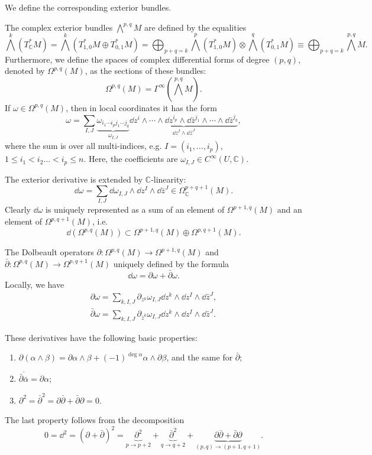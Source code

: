 We define the corresponding exterior bundles.

\begin{defn}
    The complex exterior bundles $\bigwedge^{p,q}M$ are defined by the equalities \[\bigwedge^k(T^\ast_\mathbb{C}M)=\bigwedge^k(T^\ast_{1,0}M\oplus T^\ast_{0,1}M)=\bigoplus_{p+q=k}\bigwedge^p(T^\ast_{1,0}M)\otimes \bigwedge^q(T^\ast_{0,1}M)\equiv \bigoplus_{p+q=k}\bigwedge^{p,q}M.\]
    Furthermore, we define the spaces of complex differential forms of degree $(p,q)$, denoted by $\Omega^{p,q}(M)$, as the sections of these bundles:
    \[\Omega^{p,q}(M)=\Gamma^\infty(\bigwedge^{p,q}M).\]
    If $\omega\in\Omega^{p,q}(M)$, then in local coordinates it has the form
    \[\omega=\sum_{I,J}\underbrace{\omega_{i_1\cdots i_pj_1\cdots j_q}}_{\omega_{I,J}}\underbrace{\dd z^i\wedge\cdots\wedge \dd z^{i_p}\wedge\dd \bar z^{j_1}\wedge\cdots\wedge \dd\bar z^{j_q}}_{\dd z^I\wedge \dd\bar z^J},\]
    where the sum is over all multi-indices, e.g. $I=(i_1,\ldots,i_p)$, $1\leq i_1<i_2\ldots<i_p\leq n$. Here, the coefficients are $\omega_{I,J}\in C^\infty (U,\mathbb{C})$.
\end{defn}

 The exterior derivative is extended by $\mathbb{C}$-linearity:
    \[\dd \omega=\sum_{I,J}\dd\omega_{I,J}\wedge\dd z^I\wedge\dd \bar z^J\in\Omega^{p+q+1}_\mathbb{C}(M).\]
Clearly $\dd\omega$ is uniquely represented as a sum of an element of $\Omega^{p+1,q}(M)$ and an element of $\Omega^{p,q+1}(M)$, i.e.
\[\dd(\Omega^{p,q}(M))\subset \Omega^{p+1,q}(M)\oplus\Omega^{p,q+1}(M).\]

\begin{defn}
    The Dolbeault operators $\partial:\Omega^{p,q}(M)\to\Omega^{p+1,q}(M)$ and $\bar\partial:\Omega^{p,q}(M)\to\Omega^{p,q+1}(M)$ uniquely defined by the formula
    \[\dd\omega=\partial\omega+\bar\partial\omega.\]
    Locally, we have 
    \begin{align}
        \partial\omega=\sum_{k,I,J}\partial_{z^k}\omega_{I,J}\dd z^k\wedge\dd z^I\wedge \dd\bar z^J,\\
        \bar\partial\omega=\sum_{k,I,J}\partial_{\bar z^k}\omega_{I,J}\dd z^k\wedge\dd z^I\wedge \dd\bar z^J.
    \end{align}
\end{defn}

These derivatives have the following basic properties:
\begin{enumerate}
    \item $\partial(\alpha\wedge\beta)=\partial\alpha\wedge\beta+(-1)^{\deg\alpha}\alpha\wedge\partial\beta$, and the same for $\bar\partial$;
    \item $\overline{\bar\partial\bar\alpha}=\partial\alpha$;
    \item $\partial^2=\bar\partial^2=\partial\bar\partial+\bar\partial\partial=0.$
\end{enumerate}
The last property follows from the decomposition \[0=\dd^2=(\partial+\bar\partial)^2=\underbrace{\partial^2}_{p\to p+2}+\underbrace{\bar\partial^2}_{q\to q+2}+\underbrace{\partial\bar\partial+\bar\partial\partial}_{(p,q)\to(p+1,q+1)}.\]


